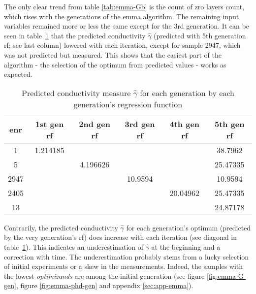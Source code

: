 The only clear trend from table \ref{tab:emma-Gb} is the count of \gls{zro} layers count, which rises with the generations of the \gls{emma} algorithm.
The remaining input variables remained more or less the same except for the 3rd generation. 
%
It can be seen in table~\ref{tab:emma-pred-G} 
that the predicted conductivity $\hat{\gamma}$ 
(predicted with 5th generation \gls{rf}; see last column) lowered with each iteration, 
except for sample 2947, which was not predicted but measured. 
This shows that the easiest part of the algorithm - the selection of the optimum 
from predicted values - works as expected. 
\begin{table}
	\centering
    \caption{Predicted conductivity measure $\hat{\gamma}$ for each generation by each generation's regression function}  
    \label{tab:emma-pred-G}
    \begin{tabular}{cccccc}
        \hline\hline
    enr &1st gen \gls{rf}   &2nd gen \gls{rf} &3rd gen \gls{rf}    &4th gen \gls{rf}   &5th gen \gls{rf}\\
        \hline
    1       &1.214185    &       &       &       &38.7962       \\
    5       &       &4.196626       &       &       &25.47335       \\
    2947    &       &       &10.9594    &       &10.9594       \\
    2405    &       &       &       &20.04962   &25.47335       \\
    13      &       &       &       &       &24.87178   \\
        \hline\hline
    \end{tabular}
\end{table}
%
Contrarily, the predicted conductivity $\hat{\gamma}$ for each generation's optimum
(predicted by the very generation's \gls{rf}) does increase with each iteration 
(see diagonal in table~\ref{tab:emma-pred-G}). 
This indicates an underestimation of $\hat\gamma$ at the beginning and a correction with time. 
The underestimation probably stems from a lucky selection of initial experiments or a skew in the measurements. 
\linebreak[4]
Indeed, the samples with the lowest \textit{optimizands} are among the initial generation (see figure \ref{fig:emma-G-gen}, figure \ref{fig:emma-phd-gen} and appendix \ref{sec:app-emma}).

